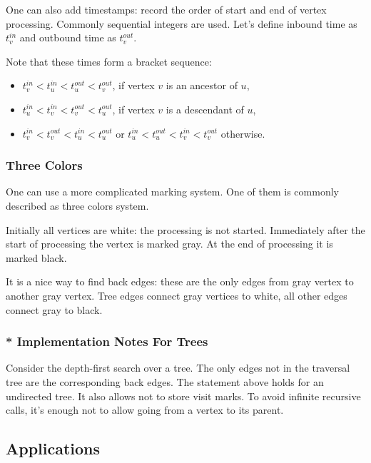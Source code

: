 \documentclass[a4paper,12pt]{article}
\begin{document}
      One can also add timestamps: record the order of start and end
      of vertex processing. Commonly sequential integers are used.
      Let's define inbound time as $t^{in}_v$ and outbound time as
      $t^{out}_v$.

      Note that these times form a bracket sequence:
      \begin{itemize}
        \item $t^{in}_v < t^{in}_u < t^{out}_u < t^{out}_v$, if vertex
          $v$ is an ancestor of $u$,
        \item $t^{in}_u < t^{in}_v < t^{out}_v < t^{out}_u$, if vertex
          $v$ is a descendant of $u$,
        \item $t^{in}_v < t^{out}_v < t^{in}_u < t^{out}_u$ or
          $t^{in}_u < t^{out}_u < t^{in}_v < t^{out}_v$ otherwise.
      \end{itemize}

      \subsubsection{Three Colors}

      One can use a more complicated marking system. One of them is
      commonly described as three colors system.

      Initially all vertices are white: the processing is not started.
      Immediately after the start of processing the vertex is marked
      gray. At the end of processing it is marked black.

      It is a nice way to find back edges: these are the only edges
      from gray vertex to another gray vertex. Tree edges connect
      gray vertices to white, all other edges connect gray to black.

      \subsubsection{* Implementation Notes For Trees}

      Consider the depth-first search over a tree. The only edges
      not in the traversal tree are the corresponding back edges.
      The statement above holds for an undirected tree. It also
      allows not to store visit marks. To avoid infinite recursive
      calls, it's enough not to allow going from a vertex to its parent.

    \subsection{Applications}
\end{document}
